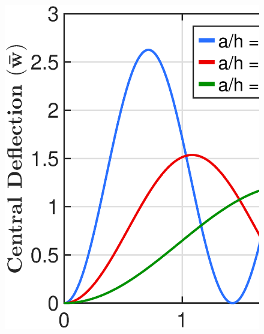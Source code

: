 \documentclass[3p,preprint,12pt]{elsarticle}
\begin{document}
\begin{figure}
	\centering
	\begin{minipage}{\textwidth}
		\graphicspath{{./All_Images./}}
		\centering
		{\includegraphics[scale=0.3]{For_FFT_h_a_Time_Response.eps}}
	\end{minipage}\vspace{0.5cm}
	\begin{minipage}{\textwidth}
		\graphicspath{{./All_Images./}}
		\centering

\end{minipage}
\end{figure}
\end{document}
